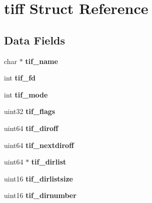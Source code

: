 \hypertarget{structtiff}{}\section{tiff Struct Reference}
\label{structtiff}
\subsection*{Data Fields}
\begin{DoxyCompactItemize}
\item 
\hypertarget{structtiff_a16cd6abed402e42e68e26c5b21f68552}{}char $\ast$ {\bfseries tif\+\_\+name}\label{structtiff_a16cd6abed402e42e68e26c5b21f68552}

\item 
\hypertarget{structtiff_a0f535b8c46c49998c2a9b9857f896369}{}int {\bfseries tif\+\_\+fd}\label{structtiff_a0f535b8c46c49998c2a9b9857f896369}

\item 
\hypertarget{structtiff_afc94e9812d02b5afb2fd2f6ffa3e11d0}{}int {\bfseries tif\+\_\+mode}\label{structtiff_afc94e9812d02b5afb2fd2f6ffa3e11d0}

\item 
\hypertarget{structtiff_aa08690e528a6a072e353e0789df9535f}{}uint32 {\bfseries tif\+\_\+flags}\label{structtiff_aa08690e528a6a072e353e0789df9535f}

\item 
\hypertarget{structtiff_a806a7809b0a1f192f5f9c36c5b622add}{}uint64 {\bfseries tif\+\_\+diroff}\label{structtiff_a806a7809b0a1f192f5f9c36c5b622add}

\item 
\hypertarget{structtiff_ae4bcbd195cea96c3f6342c7335a839b9}{}uint64 {\bfseries tif\+\_\+nextdiroff}\label{structtiff_ae4bcbd195cea96c3f6342c7335a839b9}

\item 
\hypertarget{structtiff_a3d00e229121ea230d1eaf4c9e1561b14}{}uint64 $\ast$ {\bfseries tif\+\_\+dirlist}\label{structtiff_a3d00e229121ea230d1eaf4c9e1561b14}

\item 
\hypertarget{structtiff_a9a25772f2923290db5ac9823019badfb}{}uint16 {\bfseries tif\+\_\+dirlistsize}\label{structtiff_a9a25772f2923290db5ac9823019badfb}

\item 
\hypertarget{structtiff_a3908a52ea7890a60dc82ac1b26e1dc5f}{}uint16 {\bfseries tif\+\_\+dirnumber}\label{structtiff_a3908a52ea7890a60dc82ac1b26e1dc5f}


\end{DoxyCompactItemize}
